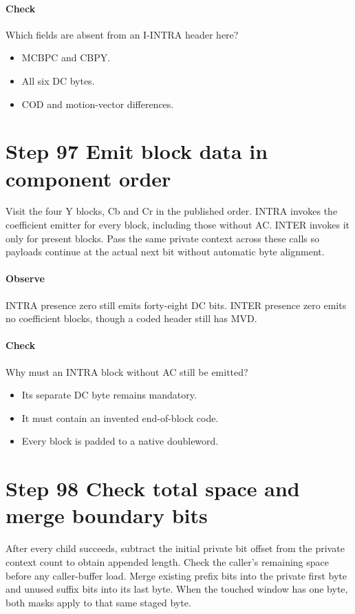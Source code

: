\paragraph{Check} Which fields are absent from an I-INTRA header here?
\begin{itemize}
  \item[A.] MCBPC and CBPY.
  \item[B.] All six DC bytes.
  \item[C.] COD and motion-vector differences.
\end{itemize}

\section{Step 97 Emit block data in component order}\label{h263-syntax-s07}
Visit the four Y blocks, Cb and Cr in the published order. INTRA invokes the
coefficient emitter for every block, including those without AC. INTER invokes
it only for present blocks. Pass the same private context across these calls so
payloads continue at the actual next bit without automatic byte alignment.

\paragraph{Observe} INTRA presence zero still emits forty-eight DC bits. INTER
presence zero emits no coefficient blocks, though a coded header still has MVD.
\paragraph{Check} Why must an INTRA block without AC still be emitted?
\begin{itemize}
  \item[A.] Its separate DC byte remains mandatory.
  \item[B.] It must contain an invented end-of-block code.
  \item[C.] Every block is padded to a native doubleword.
\end{itemize}

\section{Step 98 Check total space and merge boundary bits}\label{h263-syntax-s08}
After every child succeeds, subtract the initial private bit offset from the
private context count to obtain appended length. Check the caller's remaining
space before any caller-buffer load. Merge existing prefix bits into the private
first byte and unused suffix bits into its last byte. When the touched window
has one byte, both masks apply to that same staged byte.

